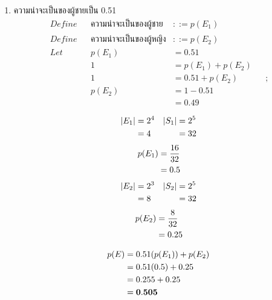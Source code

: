 \documentclass{article}
\begin{document}
\begin{enumerate}
\begin{enumerate}
	\item{ความน่าจะเป็นของผู้ชายเป็น 0.51}
	\begin{align*}
	Define	&&		\text{ความน่าจะเป็นของผู้ชาย}	&::=	p(E_1)				&&					\\
	Define	&&		\text{ความน่าจะเป็นของผู้หญิง}	&::=	p(E_2)				&&					\\
	Let		&&		p(E_1)						&=		0.51				&& \tag{1}			\\
			&&		1							&=		p(E_1) + p(E_2)		&&					\\
			&&		1							&=		0.51 + p(E_2)		&& ; \tag{1}		\\
			&&		p(E_2)						&= 		1 - 0.51			&&					\\
			&&									&= 		0.49
	\end{align*}
	\begin{multicols}{2}
	\noindent
		\begin{align*}
		|E_1| &= 2^4 & |S_1| &= 2^5 \notag \\
		&= 4 & &= 32
		\end{align*}
		\begin{equation}
		\begin{split}
		p(E_1) &= \frac{16}{32} \notag \\
		&= 0.5
		\end{split}
		\end{equation}
	\columnbreak
		\begin{align*}
		|E_2| &= 2^3 & |S_2| &= 2^5 \notag \\
		&= 8 & &= 32
		\end{align*}
		\begin{equation}
		\begin{split}
		p(E_2) &= \frac{8}{32} \notag \\
		&= 0.25
		\end{split}
		\end{equation}
	\end{multicols}
	\noindent
	\begin{equation}
	\begin{split}
	p(E) &= 0.51(p(E_1)) + p(E_2) \notag \\
	&= 0.51(0.5) + 0.25 \\
	&= 0.255 + 0.25 \\
	&= \mathbf{0.505}
	\end{split}
	\end{equation}
	
	\end{enumerate}

\pagebreak


\end{enumerate}
\end{document}
